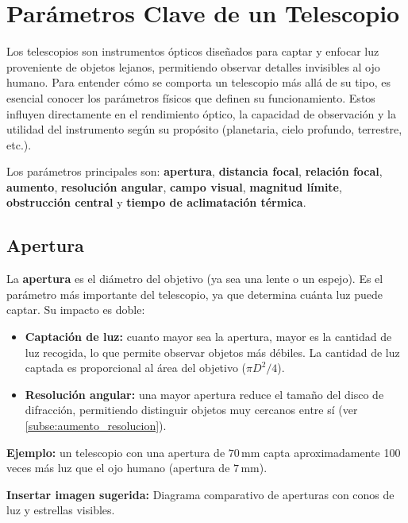 \section{Parámetros Clave de un Telescopio}

Los telescopios son instrumentos ópticos diseñados para captar y enfocar luz proveniente de objetos lejanos, permitiendo observar detalles invisibles al ojo humano. Para entender cómo se comporta un telescopio más allá de su tipo, es esencial conocer los parámetros físicos que definen su funcionamiento. Estos influyen directamente en el rendimiento óptico, la capacidad de observación y la utilidad del instrumento según su propósito (planetaria, cielo profundo, terrestre, etc.).

Los parámetros principales son: \textbf{apertura}, \textbf{distancia focal}, \textbf{relación focal}, \textbf{aumento}, \textbf{resolución angular}, \textbf{campo visual}, \textbf{magnitud límite}, \textbf{obstrucción central} y \textbf{tiempo de aclimatación térmica}.

\subsection{Apertura}
\label{subsec:apertura}

La \textbf{apertura} es el diámetro del objetivo (ya sea una lente o un espejo). Es el parámetro más importante del telescopio, ya que determina cuánta luz puede captar. Su impacto es doble:

\begin{itemize}
	\item \textbf{Captación de luz:} cuanto mayor sea la apertura, mayor es la cantidad de luz recogida, lo que permite observar objetos más débiles. La cantidad de luz captada es proporcional al área del objetivo ($\pi D^2/4$).
	\item \textbf{Resolución angular:} una mayor apertura reduce el tamaño del disco de difracción, permitiendo distinguir objetos muy cercanos entre sí (ver \ref{subse:aumento_resolucion}).
\end{itemize}

\textbf{Ejemplo:} un telescopio con una apertura de $70\,\mathrm{mm}$ capta aproximadamente 100 veces más luz que el ojo humano (apertura de $7\,\mathrm{mm}$).

\vspace{0.3cm}
\textbf{Insertar imagen sugerida:} Diagrama comparativo de aperturas con conos de luz y estrellas visibles.

